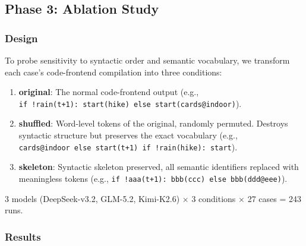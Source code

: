 \documentclass{article}
\begin{document}
\subsection{Phase 3: Ablation Study}\label{phase-3-ablation-study}



\subsubsection{Design}\label{design}



To probe sensitivity to syntactic order and semantic vocabulary, we transform each case's code-frontend compilation into three conditions:



\begin{enumerate}


\item

  \textbf{original}: The normal code-frontend output (e.g., \texttt{if\ !rain(t+1):\ start(hike)\ else\ start(cards@indoor)}).

\item

  \textbf{shuffled}: Word-level tokens of the original, randomly permuted. Destroys syntactic structure but preserves the exact vocabulary (e.g., \texttt{cards@indoor\ else\ start(t+1)\ if\ !rain(hike):\ start}).

\item

  \textbf{skeleton}: Syntactic skeleton preserved, all semantic identifiers replaced with meaningless tokens (e.g., \texttt{if\ !aaa(t+1):\ bbb(ccc)\ else\ bbb(ddd@eee)}).

\end{enumerate}



3 models (DeepSeek-v3.2, GLM-5.2, Kimi-K2.6) $\times$ 3 conditions $\times$ 27 cases = 243 runs.



\subsubsection{Results}\label{results-1}
\end{document}

